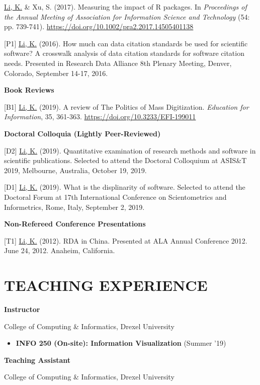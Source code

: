 \documentclass[margin, 10pt]{res} %
\begin{document}
\begin{resume}
[P2] \underline{Li, K.} \& Xu, S. (2017). Measuring the impact of R packages. In \textit{Proceedings of the Annual Meeting of Association for Information Science and Technology} (54: pp. 739-741). \href{https://doi.org/10.1002/pra2.2017.14505401138}{https://doi.org/10.1002/pra2.2017.14505401138}

[P1] \underline{Li, K.} (2016). How much can data citation standards be used for scientific software? A crosswalk analysis of data citation standards for software citation needs. Presented in Research Data Alliance 8th Plenary Meeting, Denver, Colorado, September 14-17, 2016.

\textbf{Book Reviews}

[B1] \underline{Li, K.} (2019). A review of The Politics of Mass Digitization. \textit{Education for Information}, 35, 361-363. \href{https://doi.org/10.3233/EFI-199011}{https://doi.org/10.3233/EFI-199011}

\textbf{Doctoral Colloquia (Lightly Peer-Reviewed)}

[D2] \underline{Li, K.} (2019). Quantitative examination of research methods and software in scientific publications. Selected to attend the Doctoral Colloquium at ASIS\&T 2019, Melbourne, Australia, October 19, 2019.

[D1] \underline{Li, K.} (2019). What is the displinarity of software. Selected to attend the Doctoral Forum at 17th International Conference on Scientometrics and Informetrics, Rome, Italy, September 2, 2019.

\textbf{Non-Refereed Conference Presentations}

[T1] \underline{Li, K.} (2012). RDA in China. Presented at ALA Annual Conference 2012. June 24, 2012. Anaheim, California.

\section{TEACHING EXPERIENCE}

\textbf{Instructor}

College of Computing \& Informatics, Drexel University

\begin{itemize}
\item \textbf{INFO 250 (On-site): Information Visualization} (Summer '19)
\end{itemize}

\textbf{Teaching Assistant}

College of Computing \& Informatics, Drexel University


\end{resume}
\end{document}

